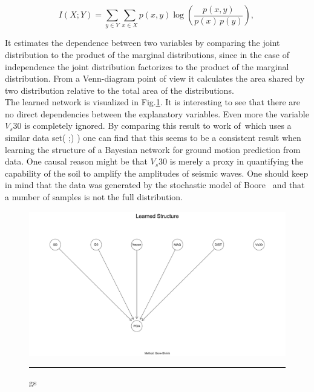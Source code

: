 \begin{equation}
I(X;Y) = \sum_{y \in Y} \sum_{x \in X} 
                 p(x,y) \log{ \left(\frac{p(x,y)}{p(x)\,p(y)}
                              \right) }, \,\! 
\label{eqn:mutual}
\end{equation}

 It estimates the dependence between two variables by comparing the joint distribution to the product of the marginal distributions, since in the case of independence the joint distribution factorizes to the product of the marginal distribution. From a Venn-diagram point of view it calculates the area shared by two distribution relative to the total area of the distributions.\\
The learned network is visualized in Fig.\ref{fig:gs}. It is interesting to see that there are no direct dependencies between the explanatory variables. Even more the variable $V_s30$ is completely ignored. By comparing this result to work of~\citep{Vogel2014}which uses a similar data set( ;) ) one can find that this seems to be a consistent result when learning the structure of a Bayesian network for ground motion prediction from data. One causal reason might be that $V_s30$ is merely a proxy in quantifying the capability of the soil to amplify the amplitudes of seismic waves. One should keep in mind that the data was generated by the stochastic model of Boore~\citep{boore2003} and that a number of samples is not the full distribution.\\
\begin{figure}[htbp]
	\centering
		\includegraphics[scale=0.33]{Figures/gs_one.pdf}
		\rule{35em}{0.5pt}
	\caption[Contraint-based Grow-Shrink Network]{gs}
	\label{fig:gs}
\end{figure}

